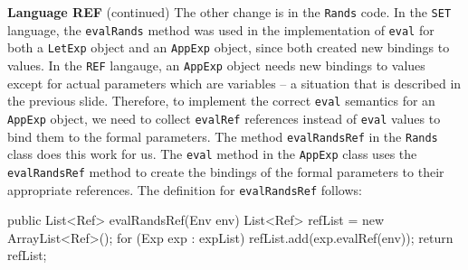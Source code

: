 \begin{minipage}[t]{\sw}
\slidenumber
\LARGE
{\bf Language REF} (continued)\exx
The other change is in the \verb'Rands' code.
In the \verb'SET' language,
the \verb'evalRands' method was used in
the implementation of \verb'eval'
for both a \verb'LetExp' object and an \verb'AppExp' object,
since both created new bindings to values.
In the \verb'REF' langauge, 
an \verb'AppExp' object needs new bindings to values
except for actual parameters which are variables --
a situation that is described in the previous slide.
Therefore, to implement the correct \verb'eval' semantics
for an \verb'AppExp' object,
we need to collect \verb'evalRef' references
instead of \verb'eval' values
to bind them to the formal parameters.
The method \verb'evalRandsRef' in the \verb'Rands' class
does this work for us.
The \verb'eval' method in the \verb'AppExp' class uses
the \verb'evalRandsRef' method
to create the bindings of the formal parameters
to their appropriate references.
The definition for \verb'evalRandsRef' follows:
\begin{qv}
    public List<Ref> evalRandsRef(Env env) {
        List<Ref> refList = new ArrayList<Ref>();
        for (Exp exp : expList)
            refList.add(exp.evalRef(env));
        return refList;
    }
\end{qv}
\end{minipage}

